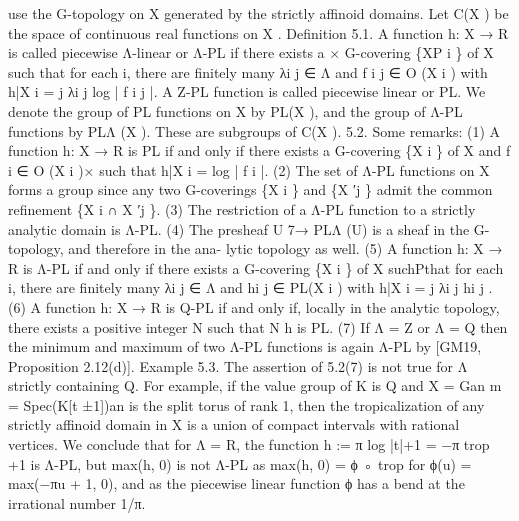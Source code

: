 \documentclass[
  10pt,
]{article}
\newenvironment{Shaded}{}{}
\newcommand{\NormalTok}[1]{#1}
\begin{document}
\begin{Shaded}
\begin{Highlighting}[]
\NormalTok{use the G{-}topology on X generated by the strictly affinoid domains. Let C(X ) be the space}
\NormalTok{of continuous real functions on X .}
\NormalTok{Definition 5.1. A function h: X → R is called piecewise Λ{-}linear or Λ{-}PL if there exists a}
\NormalTok{                                                                                                    ×}
\NormalTok{G{-}covering \{XP i \} of X such that for each i, there are finitely many λi j ∈ Λ and f i j ∈ O (X i )}
\NormalTok{with h|X i = j λi j log | f i j |. A Z{-}PL function is called piecewise linear or PL.}
\NormalTok{  We denote the group of PL functions on X by PL(X ), and the group of Λ{-}PL functions}
\NormalTok{by PLΛ (X ). These are subgroups of C(X ).}
\NormalTok{5.2. Some remarks:}
\NormalTok{   (1) A function h: X → R is PL if and only if there exists a G{-}covering \{X i \} of X and}
\NormalTok{       f i ∈ O (X i )× such that h|X i = log | f i |.}
\NormalTok{   (2) The set of Λ{-}PL functions on X forms a group since any two G{-}coverings \{X i \} and}
\NormalTok{       \{X ′j \} admit the common refinement \{X i ∩ X ′j \}.}
\NormalTok{   (3) The restriction of a Λ{-}PL function to a strictly analytic domain is Λ{-}PL.}
\NormalTok{   (4) The presheaf U 7→ PLΛ (U) is a sheaf in the G{-}topology, and therefore in the ana{-}}
\NormalTok{       lytic topology as well.}
\NormalTok{   (5) A function h: X → R is Λ{-}PL if and only if there exists a G{-}covering \{X i \} of}
\NormalTok{       X suchPthat for each i, there are finitely many λi j ∈ Λ and hi j ∈ PL(X i ) with}
\NormalTok{       h|X i = j λi j hi j .}
\NormalTok{   (6) A function h: X → R is Q{-}PL if and only if, locally in the analytic topology, there}
\NormalTok{       exists a positive integer N such that N h is PL.}
\NormalTok{   (7) If Λ = Z or Λ = Q then the minimum and maximum of two Λ{-}PL functions is}
\NormalTok{       again Λ{-}PL by [GM19, Proposition 2.12(d)].}
\NormalTok{Example 5.3. The assertion of 5.2(7) is not true for Λ strictly containing Q. For example,}
\NormalTok{if the value group of K is Q and X = Gan m}
\NormalTok{                                            = Spec(K[t ±1])an is the split torus of rank 1, then}
\NormalTok{the tropicalization of any strictly affinoid domain in X is a union of compact intervals with}
\NormalTok{rational vertices. We conclude that for Λ = R, the function h := π log |t|+1 = −π trop +1}
\NormalTok{is Λ{-}PL, but max(h, 0) is not Λ{-}PL as max(h, 0) = ϕ ◦ trop for ϕ(u) = max(−πu + 1, 0),}
\NormalTok{and as the piecewise linear function ϕ has a bend at the irrational number 1/π.}

\end{Highlighting}
\end{Shaded}
\end{document}
